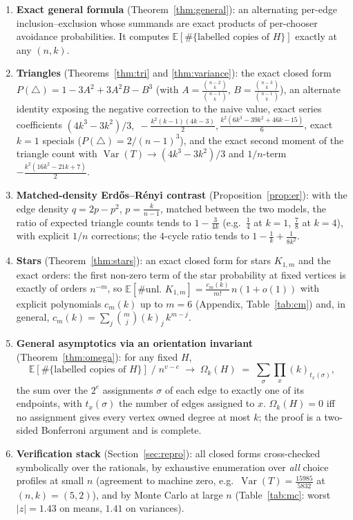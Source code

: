 \documentclass[11pt,a4paper]{article}
\theoremstyle{definition}
\theoremstyle{definition}
\begin{document}
\begin{enumerate}
\item \textbf{Exact general formula} (Theorem~\ref{thm:general}): an alternating
per-edge inclusion--exclusion whose summands are exact products of per-chooser
avoidance probabilities. It computes
$\mathbb E[\#\{\text{labelled copies of }H\}]$ exactly at any $(n, k)$.
\item \textbf{Triangles} (Theorems~\ref{thm:tri} and \ref{thm:variance}):
the exact closed form
$P(\triangle) = 1-3A^2+3A^2B-B^3$ (with $A=\frac{\binom{n-2}{k}}{\binom{n-1}{k}}$,
$B=\frac{\binom{n-3}{k}}{\binom{n-1}{k}}$), an alternate identity exposing the
negative correction to the naive value, exact series coefficients
$(4k^3-3k^2)/3,\; -\frac{k^2(k-1)(4k-3)}{2},
\frac{k^2(6k^3-39k^2+46k-15)}{6}$, exact $k=1$ specials
($P(\triangle)=2/(n-1)^3$), and the exact second moment of the triangle count with
$\operatorname{Var}(T)\to(4k^3-3k^2)/3$ and $1/n$-term
$-\frac{k^2(16k^2-21k+7)}{2}$.
\item \textbf{Matched-density Erd\H{o}s--R\'enyi contrast}
(Proposition~\ref{prop:er}): with the edge density $q=2p-p^{2}$,
$p=\tfrac{k}{n-1}$, matched between the two models, the ratio of expected triangle
counts tends to $1-\tfrac{3}{4k}$ (e.g.\ $\tfrac14$ at $k=1$,
$\tfrac78$ at $k=4$), with explicit $1/n$ corrections; the $4$-cycle ratio tends to
$1-\tfrac1k+\tfrac{1}{8k^2}$.
\item \textbf{Stars} (Theorem~\ref{thm:stars}): an exact closed form for stars
$K_{1,m}$ and the exact orders: the first non-zero term of the star probability at
fixed vertices is exactly of orders $n^{-m}$, so
$\mathbb E[\#\text{unl. }K_{1,m}] = \frac{c_m(k)}{m!}\,n(1+o(1))$ with explicit
polynomials $c_m(k)$ up to $m=6$ (Appendix, Table~\ref{tab:cm}) and, in general,
$c_m(k)=\sum_{j}\binom{m}{j}(k)_{j}\,k^{m-j}$.
\item \textbf{General asymptotics via an orientation invariant}
(Theorem~\ref{thm:omega}): for any fixed $H$,
\[
\mathbb E[\#\{\text{labelled copies of }H\}]\;/\; n^{v-e}\;\longrightarrow\;
\Omega_k(H)\;=\;\sum_{\sigma}\prod_{x}(k)_{t_x(\sigma)},
\]
the sum over the $2^{e}$ assignments $\sigma$ of each edge to exactly one of its
endpoints, with $t_x(\sigma)$ the number of edges assigned to $x$.
$\Omega_k(H)=0$ iff no assignment gives every vertex owned degree at most $k$; the
proof is a two-sided Bonferroni argument and is complete.
\item \textbf{Verification stack} (Section~\ref{sec:repro}): all closed forms
cross-checked symbolically over the rationals, by exhaustive enumeration over
\emph{all} choice profiles at small $n$ (agreement to machine zero, e.g.\
$\operatorname{Var}(T)=\tfrac{15985}{5832}$ at $(n,k)=(5,2)$), and by Monte Carlo at
large $n$ (Table~\ref{tab:mc}: worst $|z|=1.43$ on means, $1.41$ on variances).
\end{enumerate}
\end{document}
